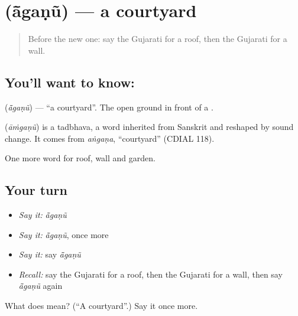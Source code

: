 \section[\texorpdfstring{\gu{આંગણું} (ā̃gaṇũ)}{આંગણું (ā̃gaṇũ)}]{ (ā̃gaṇũ) — a courtyard}

\label{lesson:GU-C63-courtyard}



\begin{quote}
Before the new one: say the Gujarati for a roof, then the Gujarati for a wall.
\end{quote}

\subsection*{You'll want to know: }
\textbf{} (\emph{ā̃gaṇũ}) — \textquotedblleft{}a courtyard\textquotedblright{}. The open ground in front of a \textbf{}.

\begin{cousinweb}
\textbf{} (\emph{āṁgaṇũ}) is a tadbhava, a word inherited from Sanskrit and reshaped by sound change. It comes from \emph{aṅgaṇa}, \textquotedblleft{}courtyard\textquotedblright{} (CDIAL 118).
\end{cousinweb}

\begin{grammarlens}[title={What you've built}]
One more word for roof, wall and garden.
\end{grammarlens}

\subsection*{Your turn}
\begin{itemize}
\raggedright
  \item \emph{Say it:} \emph{ā̃gaṇũ}
  \item \emph{Say it:} \emph{ā̃gaṇũ}, once more
  \item \emph{Say it:} say \emph{ā̃gaṇũ}
  \item \emph{Recall:} say the Gujarati for a roof, then the Gujarati for a wall, then say \emph{ā̃gaṇũ} again
\end{itemize}

\begin{tcolorbox}[breakable,colback=teal!4,colframe=teal!35!black,title={Before you move on}]
What does  mean? (\textquotedblleft{}A courtyard\textquotedblright{}.) Say it once more.
\end{tcolorbox}
